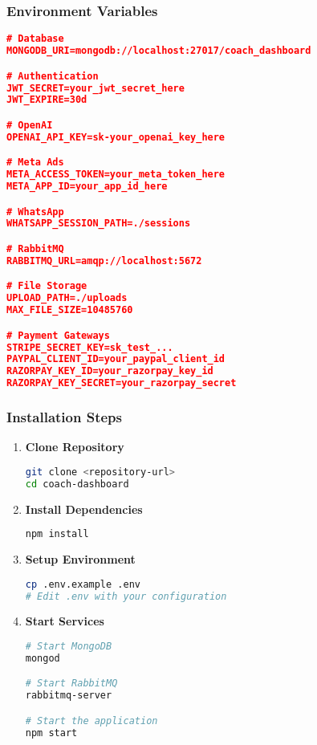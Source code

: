 \documentclass[12pt,a4paper]{article}
\newcommand{\samplecode}[1]{\begin{lstlisting}[language=JSON]#1\end{lstlisting}}
\begin{document}
\subsubsection{Environment Variables}
\samplecode{
# Database
MONGODB_URI=mongodb://localhost:27017/coach_dashboard

# Authentication
JWT_SECRET=your_jwt_secret_here
JWT_EXPIRE=30d

# OpenAI
OPENAI_API_KEY=sk-your_openai_key_here

# Meta Ads
META_ACCESS_TOKEN=your_meta_token_here
META_APP_ID=your_app_id_here

# WhatsApp
WHATSAPP_SESSION_PATH=./sessions

# RabbitMQ
RABBITMQ_URL=amqp://localhost:5672

# File Storage
UPLOAD_PATH=./uploads
MAX_FILE_SIZE=10485760

# Payment Gateways
STRIPE_SECRET_KEY=sk_test_...
PAYPAL_CLIENT_ID=your_paypal_client_id
RAZORPAY_KEY_ID=your_razorpay_key_id
RAZORPAY_KEY_SECRET=your_razorpay_secret
}

\subsubsection{Installation Steps}
\begin{enumerate}
    \item \textbf{Clone Repository}
    \begin{lstlisting}[language=bash]
git clone <repository-url>
cd coach-dashboard
    \end{lstlisting}
    
    \item \textbf{Install Dependencies}
    \begin{lstlisting}[language=bash]
npm install
    \end{lstlisting}
    
    \item \textbf{Setup Environment}
    \begin{lstlisting}[language=bash]
cp .env.example .env
# Edit .env with your configuration
    \end{lstlisting}
    
    \item \textbf{Start Services}
    \begin{lstlisting}[language=bash]
# Start MongoDB
mongod

# Start RabbitMQ
rabbitmq-server

# Start the application
npm start
    \end{lstlisting}
\end{enumerate}
\end{document}

